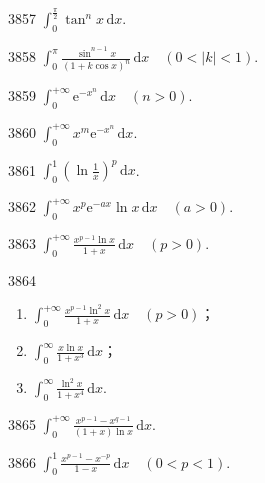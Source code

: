 \begin{prob}[S]{3857}
$\displaystyle \int_0^{\frac{\pi}{2}} \tan^n x \,\mathrm{d}x$.
\end{prob}

\begin{prob}[S]{3858}
$\displaystyle \int_0^{\pi} \frac{\sin^{n-1} x}{(1+k\cos x)^n} \,\mathrm{d}x \quad (0<|k|<1)$.
\end{prob}

\begin{prob}[S]{3859}
$\displaystyle \int_0^{+\infty} \mathrm{e}^{-x^n} \,\mathrm{d}x \quad (n>0)$.
\end{prob}

\begin{prob}[S]{3860}
$\displaystyle \int_0^{+\infty} x^m \mathrm{e}^{-x^n} \,\mathrm{d}x$.
\end{prob}

\begin{prob}[S]{3861}
$\displaystyle \int_0^1 \left(\ln\frac{1}{x}\right)^p \,\mathrm{d}x$.
\end{prob}

\begin{prob}[S]{3862}
$\displaystyle \int_0^{+\infty} x^p \mathrm{e}^{-ax} \ln x \,\mathrm{d}x \quad (a>0)$.
\end{prob}

\begin{prob}[S]{3863}
$\displaystyle \int_0^{+\infty} \frac{x^{p-1}\ln x}{1+x} \,\mathrm{d}x \quad (p>0)$.
\end{prob}

\begin{prob}[L]{3864}
\begin{enumerate}[label=(\alph*), itemsep=2pt, topsep=3pt]
\item $\displaystyle \int_0^{+\infty} \frac{x^{p-1}\ln^2 x}{1+x} \,\mathrm{d}x \quad (p>0)$；
\item $\displaystyle \int_0^{\infty} \frac{x\ln x}{1+x^3} \,\mathrm{d}x$；
\item $\displaystyle \int_0^{\infty} \frac{\ln^2 x}{1+x^4} \,\mathrm{d}x$.
\end{enumerate}
\end{prob}

\begin{prob}[S]{3865}
$\displaystyle \int_0^{+\infty} \frac{x^{p-1}-x^{q-1}}{(1+x)\ln x} \,\mathrm{d}x$.
\end{prob}

\begin{prob}[M]{3866}
$\displaystyle \int_0^1 \frac{x^{p-1}-x^{-p}}{1-x} \,\mathrm{d}x \quad (0<p<1)$.
\end{prob}

